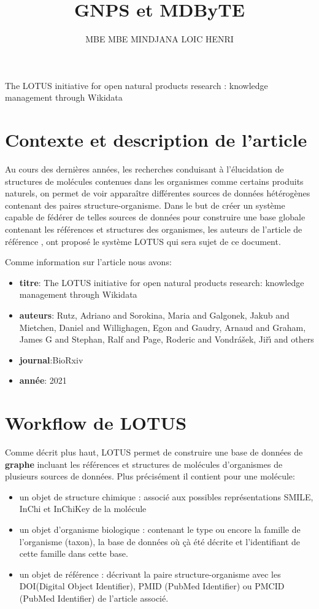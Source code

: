 \documentclass[12pt, french, latin.medieval, a4paper]{report}
\author{MBE MBE MINDJANA LOIC HENRI}
\title{GNPS et MDByTE}
\begin{document}
    
    \pagecouverture
    {The LOTUS initiative for open natural products research : knowledge management
through Wikidata}
    {}
    \tableofcontents
    \vspace{20cm}
    
    \section{Contexte et description de l'article}
    Au cours des dernières années, les recherches conduisant à l'élucidation de structures de molécules contenues dans les organismes comme certains produits naturels, on permet de voir apparaître différentes sources de données hétérogènes contenant des paires structure-organisme.
	Dans le but de créer un système capable de fédérer de telles sources de données pour construire une base globale contenant les références et structures des organismes, les auteurs de l'article de référence \cite{rutz2021lotus}, ont proposé le système LOTUS qui sera sujet de ce document.   

	Comme information sur l'article nous avons:
    \begin{itemize}
   	 \item \textbf{titre}: {The LOTUS initiative for open natural products research: knowledge management through Wikidata}
   	 \item \textbf{auteurs}: {Rutz, Adriano and Sorokina, Maria and Galgonek, Jakub and Mietchen, Daniel and Willighagen, Egon and Gaudry, Arnaud and Graham, James G and Stephan, Ralf and Page, Roderic and Vondr{\'a}{\v{s}}ek, Ji{\v{r}}{\'\i} and others}
   	 \item \textbf{journal}:{BioRxiv}
   	 \item \textbf{année}: {2021}
    \end{itemize}

	\section{Workflow de LOTUS}
	Comme décrit plus haut, LOTUS permet de construire une base de données de \textbf{graphe} incluant les références et structures de molécules d'organismes de plusieurs sources de données.
	Plus précisément il contient pour une molécule:
	\begin{itemize}
    	\item un objet de structure chimique : associé aux possibles représentations SMILE, InChi et InChiKey de la molécule
    	\item un objet d'organisme biologique : contenant le type ou encore la famille de l'organisme (taxon), la base de données où çà été décrite et l'identifiant de cette famille dans cette base.
    	\item un objet de référence : décrivant la paire structure-organisme avec les DOI(Digital Object Identifier), PMID (PubMed Identifier) ou PMCID (PubMed Identifier) de l'article associé.
	\end{itemize}
    
\end{document}
